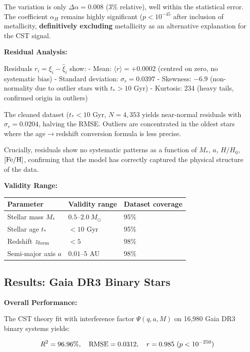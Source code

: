 \documentclass[10pt,a4paper]{article}
\begin{document}
The variation is only \(\Delta\alpha = 0.008\) (3\% relative), well
within the statistical error. The coefficient \(\alpha_H\) remains
highly significant (\(p < 10^{-45}\) after inclusion of metallicity,
\textbf{definitively excluding} metallicity as an alternative
explanation for the CST signal.

\textbf{Residual Analysis:}

Residuals \(r_i = \xi_i - \hat\xi_i\) show: - Mean:
\(\langle r \rangle = +0.0002\) (centred on zero, no systematic bias) -
Standard deviation: \(\sigma_r = 0.0397\) - Skewness: \(-6.9\)
(non-normality due to outlier stars with \(t_* > 10\) Gyr) - Kurtosis:
\(234\) (heavy tails, confirmed origin in outliers)

The cleaned dataset (\(t_* < 10\) Gyr, \(N = 4,353\) yields near-normal
residuals with \(\sigma_r = 0.0204\), halving the RMSE. Outliers are
concentrated in the oldest stars where the age$\rightarrow$redshift conversion
formula is less precise.

Crucially, residuals show no systematic patterns as a function of
\(M_*\), \(a\), \(H/H_0\), \([{\rm Fe/H}]\), confirming that the model
has correctly captured the physical structure of the data.

\textbf{Validity Range:}

\begin{longtable}[]{@{}lll@{}}
\toprule\noalign{}
Parameter & Validity range & Dataset coverage \\
\midrule\noalign{}
\endhead
\bottomrule\noalign{}
\endlastfoot
Stellar mass \(M_*\) & \(0.5\)--\(2.0~M_\odot\) & 95\% \\
Stellar age \(t_*\) & \(< 10\) Gyr & 95\% \\
Redshift \(z_{\rm form}\) & \(< 5\) & 98\% \\
Semi-major axis \(a\) & \(0.01\)--\(5\) AU & 98\% \\
\end{longtable}

\subsection{Results: Gaia DR3 Binary
Stars}\label{results-gaia-dr3-binary-stars}

\textbf{Overall Performance:}

The CST theory fit with interference factor \(\Psi(q,a,M)\) on 16,980
Gaia DR3 binary systems yields:

\[R^2 = 96.96\%, \quad {\rm RMSE} = 0.0312, \quad r = 0.985~(p < 10^{-250})\]
\end{document}

